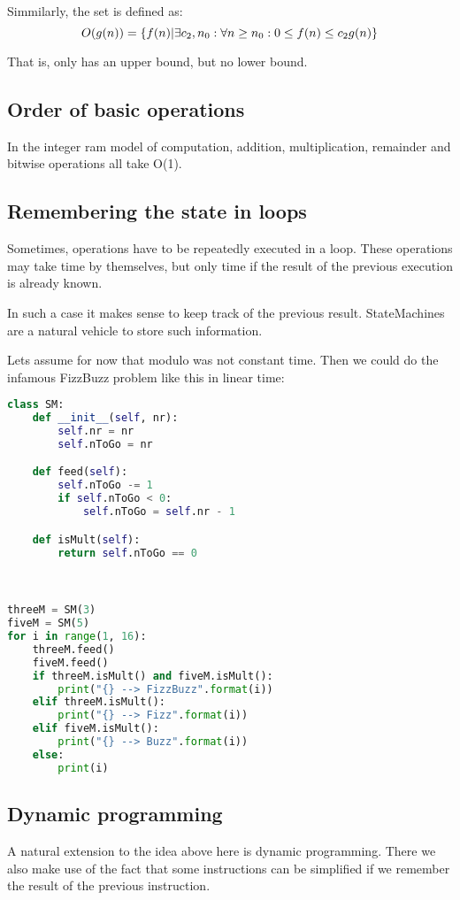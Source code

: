 Simmilarly, the set  is defined as: 
$$ O(g(n)) = \{ f(n) | \exists c_2, n_0 : \forall n \geq n_0:  0 \leq  f(n) \leq c_2 g(n) \} $$

That is, \BigOh{} only has an upper bound, but no lower bound.

\subsection{Order of basic operations}

In the integer ram model of computation, addition, multiplication, remainder and bitwise operations all take O(1).


\subsection{Remembering the state in loops}
Sometimes, operations have to be repeatedly executed in a loop. These operations may take  time by themselves, but only  time if the result of the previous execution is already known. 

In such a case it makes sense to keep track of the previous result. StateMachines are a natural vehicle to store such information. 

Lets assume for now that modulo was not constant time. Then we could do the infamous FizzBuzz problem like this in linear time: 

\begin{lstlisting}[language=python]
class SM:
    def __init__(self, nr):
        self.nr = nr
        self.nToGo = nr

    def feed(self):
        self.nToGo -= 1
        if self.nToGo < 0:
            self.nToGo = self.nr - 1

    def isMult(self):
        return self.nToGo == 0



threeM = SM(3)
fiveM = SM(5)
for i in range(1, 16):
    threeM.feed()
    fiveM.feed()
    if threeM.isMult() and fiveM.isMult():
        print("{} --> FizzBuzz".format(i))
    elif threeM.isMult():
        print("{} --> Fizz".format(i))
    elif fiveM.isMult():
        print("{} --> Buzz".format(i))
    else:
        print(i)
\end{lstlisting}

\subsection{Dynamic programming}
A natural extension to the idea above here is dynamic programming. There we also make use of the fact that some instructions can be simplified if we remember the result of the previous instruction.


